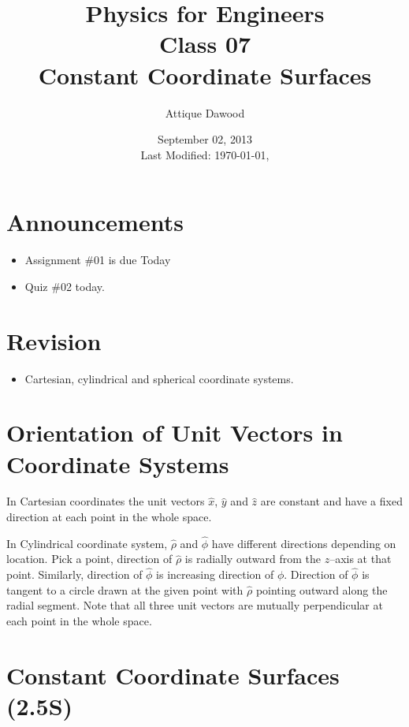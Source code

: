 \documentclass[12pt,a4paper]{article}
\title{\vspace{-2cm}Physics for Engineers\\Class 07\\Constant Coordinate Surfaces}
\author{Attique Dawood}
\date{September 02, 2013\\[0.2cm] Last Modified: \today, \currenttime}
\begin{document}
\maketitle
\section{Announcements}
\begin{itemize}
\item Assignment \#01 is due Today
\item Quiz \#02 today.
\end{itemize}
\section{Revision}
\begin{itemize}
\item Cartesian, cylindrical and spherical coordinate systems.
\end{itemize}
\section{Orientation of Unit Vectors in Coordinate Systems}
In Cartesian coordinates the unit vectors $\hat x$, $\hat y$ and $\hat z$ are constant and have a fixed direction at each point in the whole space.

In Cylindrical coordinate system, $\hat \rho$ and $\hat \phi$ have different directions depending on location. Pick a point, direction of $\hat \rho$ is radially outward from the $z$--axis at that point. Similarly, direction of $\hat \phi$ is increasing direction of $\phi$. Direction of $\hat \phi$ is tangent to a circle drawn at the given point with $\hat \rho$ pointing outward along the radial segment. Note that all three unit vectors are mutually perpendicular at each point in the whole space.
\section{Constant Coordinate Surfaces (2.5S)}
\end{document}
